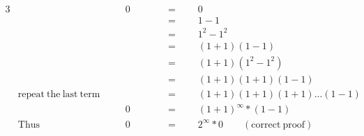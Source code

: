 \begin{alignat*}{3}
&\,&&\quad0\qquad&&=\qquad0\\
&\,&&\,&&=\qquad1-1\\
&\,&&\,&&=\qquad1^2-1^2\\
&\,&&\,&&=\qquad(1+1)(1-1)\\
&\,&&\,&&=\qquad(1+1)(1^2-1^2)\\
&\,&&\,&&=\qquad(1+1)(1+1)(1-1)\\
&\mathrm{repeat~the~last~term}&&\quad&&=\qquad(1+1)(1+1)(1+1)...(1-1)\\
&\,&&\quad0&&=\qquad(1+1)^\infty*(1-1)\\
&\mathrm{Thus}\,&&\quad0&&=\qquad2^\infty*0\qquad\mathrm{(correct~proof)}\\
\end{alignat*}

